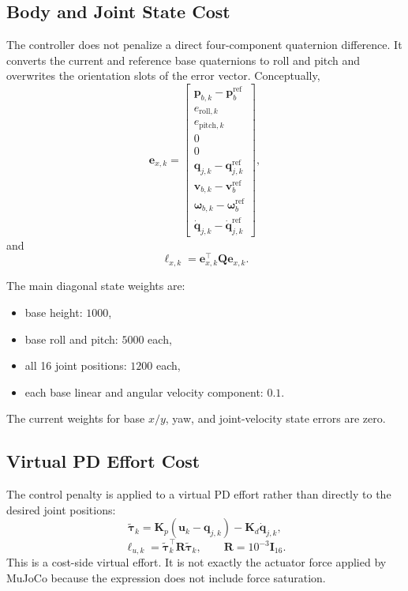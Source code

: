 \documentclass[11pt,a4paper]{article}
\begin{document}
\subsection{Body and Joint State Cost}

The controller does not penalize a direct four-component quaternion
difference. It converts the current and reference base quaternions to roll and
pitch and overwrites the orientation slots of the error vector. Conceptually,
\begin{equation}
  \bm{e}_{x,k}=
  \begin{bmatrix}
    \bm{p}_{b,k}-\bm{p}^{\mathrm{ref}}_b\\
    e_{\mathrm{roll},k}\\
    e_{\mathrm{pitch},k}\\
    0\\
    0\\
    \bm{q}_{j,k}-\bm{q}^{\mathrm{ref}}_{j,k}\\
    \bm{v}_{b,k}-\bm{v}^{\mathrm{ref}}_b\\
    \bm{\omega}_{b,k}-\bm{\omega}^{\mathrm{ref}}_b\\
    \dot{\bm{q}}_{j,k}-\dot{\bm{q}}^{\mathrm{ref}}_{j,k}
  \end{bmatrix},
\end{equation}
and
\begin{equation}
  \ell_{x,k}=\bm{e}_{x,k}^{\top}\bm{Q}\bm{e}_{x,k}.
\end{equation}

The main diagonal state weights are:
\begin{itemize}
  \item base height: $1000$,
  \item base roll and pitch: $5000$ each,
  \item all 16 joint positions: $1200$ each,
  \item each base linear and angular velocity component: $0.1$.
\end{itemize}
The current weights for base $x/y$, yaw, and joint-velocity state errors are
zero.

\subsection{Virtual PD Effort Cost}

The control penalty is applied to a virtual PD effort rather than directly to
the desired joint positions:
\begin{equation}
  \tilde{\bm{\tau}}_k=
  \bm{K}_p(\bm{u}_k-\bm{q}_{j,k})
  -\bm{K}_d
  \dot{\bm{q}}_{j,k},
\end{equation}
\begin{equation}
  \ell_{u,k}=
  \tilde{\bm{\tau}}_k^\top\bm{R}\tilde{\bm{\tau}}_k,
  \qquad
  \bm{R}=10^{-3}\bm{I}_{16}.
\end{equation}
This is a cost-side virtual effort. It is not exactly the actuator force
applied by MuJoCo because the expression does not include force saturation.
\end{document}
